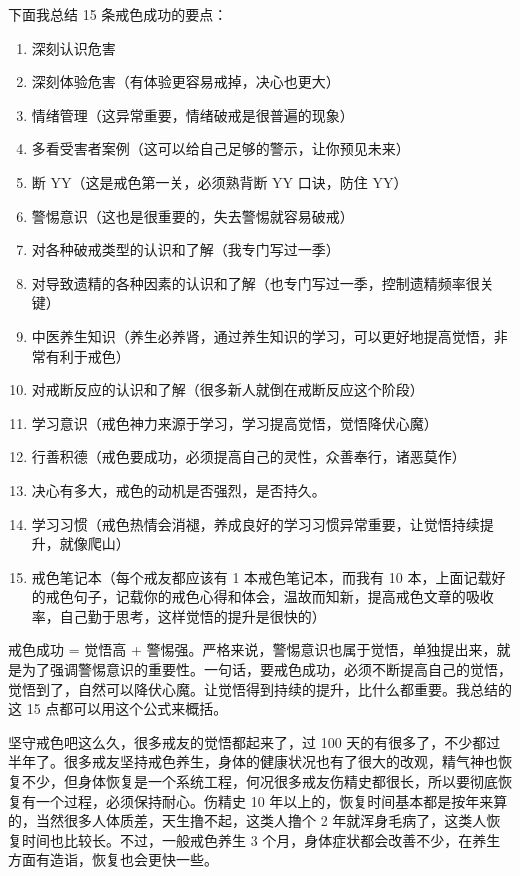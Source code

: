 \documentclass[fontset=founder]{ctexart}
\begin{document}
下面我总结 15 条戒色成功的要点：

\begin{enumerate}
    \item 深刻认识危害
    \item 深刻体验危害（有体验更容易戒掉，决心也更大）
    \item 情绪管理（这异常重要，情绪破戒是很普遍的现象）
    \item 多看受害者案例（这可以给自己足够的警示，让你预见未来）
    \item 断 YY（这是戒色第一关，必须熟背断 YY 口诀，防住 YY）
    \item 警惕意识（这也是很重要的，失去警惕就容易破戒）
    \item 对各种破戒类型的认识和了解（我专门写过一季）
    \item 对导致遗精的各种因素的认识和了解（也专门写过一季，控制遗精频率很关键）
    \item 中医养生知识（养生必养肾，通过养生知识的学习，可以更好地提高觉悟，非常有利于戒色）
    \item 对戒断反应的认识和了解（很多新人就倒在戒断反应这个阶段）
    \item 学习意识（戒色神力来源于学习，学习提高觉悟，觉悟降伏心魔）
    \item 行善积德（戒色要成功，必须提高自己的灵性，众善奉行，诸恶莫作）
    \item 决心有多大，戒色的动机是否强烈，是否持久。
    \item 学习习惯（戒色热情会消褪，养成良好的学习习惯异常重要，让觉悟持续提升，就像爬山）
    \item 戒色笔记本（每个戒友都应该有 1 本戒色笔记本，而我有 10 本，上面记载好的戒色句子，记载你的戒色心得和体会，温故而知新，提高戒色文章的吸收率，自己勤于思考，这样觉悟的提升是很快的）
\end{enumerate}

戒色成功 = 觉悟高 + 警惕强。严格来说，警惕意识也属于觉悟，单独提出来，就是为了强调警惕意识的重要性。一句话，要戒色成功，必须不断提高自己的觉悟，觉悟到了，自然可以降伏心魔。让觉悟得到持续的提升，比什么都重要。我总结的这 15 点都可以用这个公式来概括。

坚守戒色吧这么久，很多戒友的觉悟都起来了，过 100 天的有很多了，不少都过半年了。很多戒友坚持戒色养生，身体的健康状况也有了很大的改观，精气神也恢复不少，但身体恢复是一个系统工程，何况很多戒友伤精史都很长，所以要彻底恢复有一个过程，必须保持耐心。伤精史 10 年以上的，恢复时间基本都是按年来算的，当然很多人体质差，天生撸不起，这类人撸个 2 年就浑身毛病了，这类人恢复时间也比较长。不过，一般戒色养生 3 个月，身体症状都会改善不少，在养生方面有造诣，恢复也会更快一些。
\end{document}
